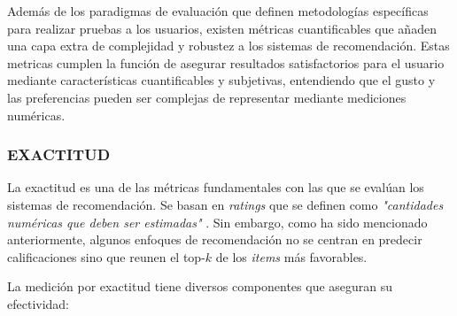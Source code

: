 Además de los paradigmas de evaluación que definen metodologías específicas para realizar pruebas a los usuarios, existen métricas cuantificables que añaden una capa extra de complejidad y robustez a los sistemas de recomendación. Estas metricas cumplen la función de asegurar resultados satisfactorios para el usuario mediante características cuantificables y subjetivas, entendiendo que el gusto y las preferencias pueden ser complejas de representar mediante mediciones numéricas.

    \subsubsection{EXACTITUD}

    La exactitud es una de las métricas fundamentales con las que se evalúan los sistemas de recomendación. Se basan en \textit{ratings} que se definen como \textit{"cantidades numéricas que deben ser estimadas" } \parencite{Aggarwal2016}. Sin embargo, como ha sido mencionado anteriormente, algunos enfoques de recomendación no se centran en predecir calificaciones sino que reunen el top-$k$ de los \textit{items} más favorables. 

    \newpage

    La medición por exactitud tiene diversos componentes que aseguran su efectividad:

